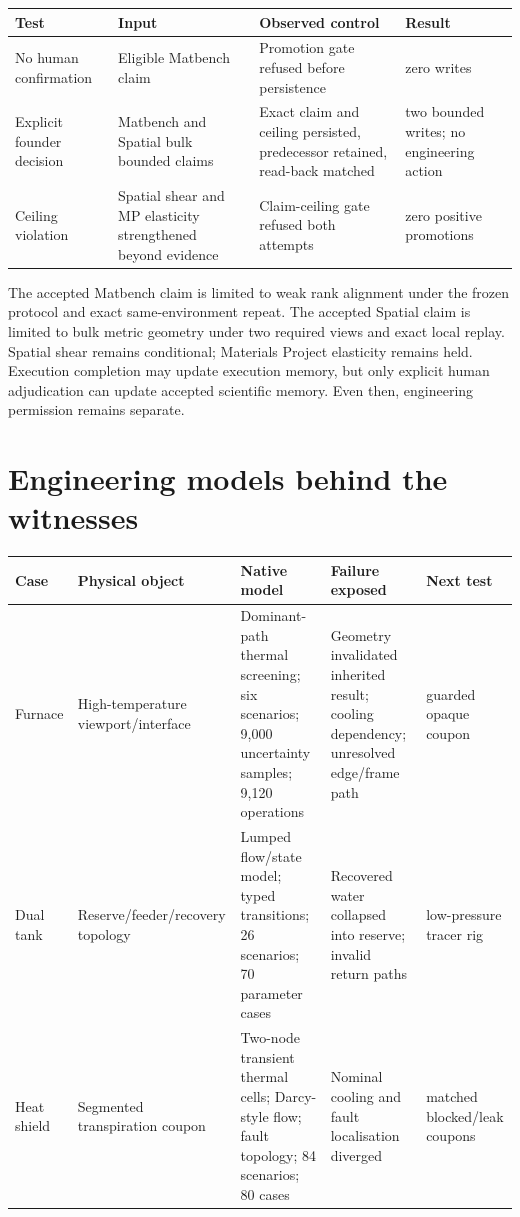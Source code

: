 \begin{tabularx}{\textwidth}{p{}p{}YY}
\toprule Test & Input & Observed control & Result\\\midrule
No human confirmation & Eligible Matbench claim & Promotion gate refused before persistence & zero writes\\
Explicit founder decision & Matbench and Spatial bulk bounded claims & Exact claim and ceiling persisted, predecessor retained, read-back matched & two bounded writes; no engineering action\\
Ceiling violation & Spatial shear and MP elasticity strengthened beyond evidence & Claim-ceiling gate refused both attempts & zero positive promotions\\\bottomrule
\end{tabularx}

The accepted Matbench claim is limited to weak rank alignment under the frozen protocol and exact same-environment repeat. The accepted Spatial claim is limited to bulk metric geometry under two required views and exact local replay. Spatial shear remains conditional; Materials Project elasticity remains held. Execution completion may update execution memory, but only explicit human adjudication can update accepted scientific memory. Even then, engineering permission remains separate.

\section{Engineering models behind the witnesses}
\begin{tabularx}{\textwidth}{p{}p{}p{}YY}
\toprule Case & Physical object & Native model & Failure exposed & Next test\\\midrule
Furnace & High-temperature viewport/interface & Dominant-path thermal screening; six scenarios; 9,000 uncertainty samples; 9,120 operations & Geometry invalidated inherited result; cooling dependency; unresolved edge/frame path & guarded opaque coupon\\
Dual tank & Reserve/feeder/recovery topology & Lumped flow/state model; typed transitions; 26 scenarios; 70 parameter cases & Recovered water collapsed into reserve; invalid return paths & low-pressure tracer rig\\
Heat shield & Segmented transpiration coupon & Two-node transient thermal cells; Darcy-style flow; fault topology; 84 scenarios; 80 cases & Nominal cooling and fault localisation diverged & matched blocked/leak coupons\\\bottomrule
\end{tabularx}

